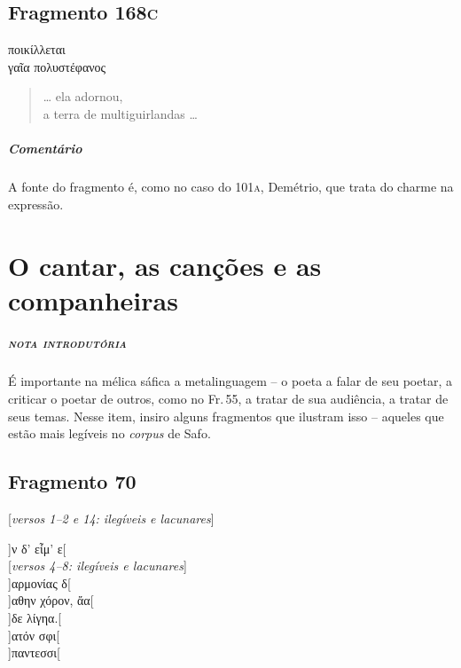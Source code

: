 \EP[2]

\section{Fragmento 168\textsc{c}}

\begin{gkverse}
ποικίλλεται\\
    γαῖα πολυστέφανος 
\end{gkverse}

\begin{verse}
\ldots{} ela adornou,\\
a terra de multiguirlandas \ldots{}
\end{verse}

\medskip

{\paragraph{Comentário} A fonte do fragmento é, como no caso do 101\textsc{a}, Demétrio, que trata do charme na expressão.}



\chapter[O cantar, as canções e as companheiras]{O cantar, as canções e as companheiras}

\vspace*{-1cm}


\paragraph{\textsc{nota introdutória}}
É importante na mélica sáfica a metalinguagem -- o poeta a falar de seu
poetar, a criticar o poetar de outros, como no Fr.\,55, a tratar de sua
audiência, a tratar de seus temas. Nesse item, insiro alguns fragmentos que
ilustram isso -- aqueles que estão mais legíveis no \textit{corpus} de Safo.


\section{Fragmento 70}

\begin{gkverse}
\textnormal{[\textit{versos 1--2 e 14: ilegíveis e lacunares}]}

]ν δ’ εἶμ’ ε[\\

\textnormal{[\textit{versos 4--8: ilegíveis e lacunares}]}\\

]αρμονίας δ[\\
         ]αθην χόρον, ἄα[\\
   ]δε λίγηα.[\\
   ]ατόν σφι[\\
  ]παντεσσι[

\end{gkverse}

